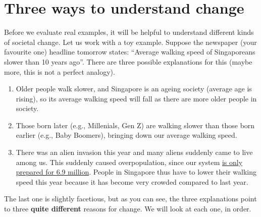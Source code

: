 \documentclass[
  openany]{book}
\begin{document}
\hypertarget{three-ways-to-understand-change}{%
\section{Three ways to understand change}\label{three-ways-to-understand-change}}

Before we evaluate real examples, it will be helpful to understand different kinds of societal change. Let us work with a toy example. Suppose the newspaper (your favourite one) headline tomorrow states: ``Average walking speed of Singaporeans slower than 10 years ago''. There are three possible explanations for this (maybe more, this is not a perfect analogy).

\begin{enumerate}
\def\labelenumi{\arabic{enumi}.}
\item
  Older people walk slower, and Singapore is an ageing society (average age is rising), so its average walking speed will fall as there are more older people in society.
\item
  Those born later (e.g., Millenials, Gen Z) are walking slower than those born earlier (e.g., Baby Boomers), bringing down our average walking speed.
\item
  There was an alien invasion this year and many aliens suddenly came to live among us. This suddenly caused overpopulation, since our system \href{https://www.strategygroup.gov.sg/media-centre/population-white-paper-a-sustainable-population-for-a-dynamic-singapore}{is only prepared for 6.9 million}. People in Singapore thus have to lower their walking speed this year because it has become very crowded compared to last year.
\end{enumerate}

The last one is slightly facetious, but as you can see, the three explanations point to three \textbf{quite different} reasons for change. We will look at each one, in order.
\end{document}

